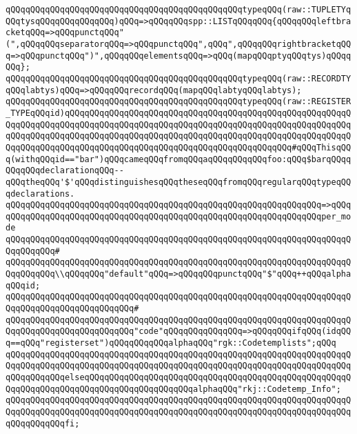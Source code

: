 \verb|qQQqqQQqqQQqqQQqqQQqqQQqqQQqqQQqqQQqqQQqqQQqqQQqtypeqQQq(raw::TUPLETYqQQqtysqQQqqQQqqQQqqQQq)qQQq=>qQQqqQQqspp::LISTqQQqqQQq{qQQqqQQqleftbracketqQQq=>qQQqpunctqQQq"(",qQQqqQQqseparatorqQQq=>qQQqpunctqQQq",qQQq",qQQqqQQqrightbracketqQQq=>qQQqpunctqQQq")",qQQqqQQqelementsqQQq=>qQQq(mapqQQqptyqQQqtys)qQQqqQQq};|\newline
\verb|qQQqqQQqqQQqqQQqqQQqqQQqqQQqqQQqqQQqqQQqqQQqqQQqtypeqQQq(raw::RECORDTYqQQqlabtys)qQQq=>qQQqqQQqrecordqQQq(mapqQQqlabtyqQQqlabtys);|\newline
\newline
\verb|qQQqqQQqqQQqqQQqqQQqqQQqqQQqqQQqqQQqqQQqqQQqqQQqtypeqQQq(raw::REGISTER_TYPEqQQqid)qQQqqQQqqQQqqQQqqQQqqQQqqQQqqQQqqQQqqQQqqQQqqQQqqQQqqQQqqQQqqQQqqQQqqQQqqQQqqQQqqQQqqQQqqQQqqQQqqQQqqQQqqQQqqQQqqQQqqQQqqQQqqQQqqQQqqQQqqQQqqQQqqQQqqQQqqQQqqQQqqQQqqQQqqQQqqQQqqQQqqQQqqQQqqQQqqQQqqQQqqQQqqQQqqQQqqQQqqQQqqQQqqQQqqQQqqQQqqQQqqQQqqQQqqQQqqQQq#qQQqThisqQQq(withqQQqid=="bar")qQQqcameqQQqfromqQQqaqQQqqQQqqQQqfoo:qQQq$barqQQqqQQqqQQqdeclarationqQQq--qQQqtheqQQq'$'qQQqdistinguishesqQQqtheseqQQqfromqQQqregularqQQqtypeqQQqdeclarations.|\newline
\verb|qQQqqQQqqQQqqQQqqQQqqQQqqQQqqQQqqQQqqQQqqQQqqQQqqQQqqQQqqQQqqQQq=>qQQq|\newline
\verb|qQQqqQQqqQQqqQQqqQQqqQQqqQQqqQQqqQQqqQQqqQQqqQQqqQQqqQQqqQQqqQQqper_mode|\newline
\verb|qQQqqQQqqQQqqQQqqQQqqQQqqQQqqQQqqQQqqQQqqQQqqQQqqQQqqQQqqQQqqQQqqQQqqQQqqQQqqQQq#|\newline
\verb|qQQqqQQqqQQqqQQqqQQqqQQqqQQqqQQqqQQqqQQqqQQqqQQqqQQqqQQqqQQqqQQqqQQqqQQqqQQqqQQq\\qQQqqQQq"default"qQQq=>qQQqqQQqpunctqQQq"$"qQQq++qQQqalphaqQQqid;|\newline
\verb|qQQqqQQqqQQqqQQqqQQqqQQqqQQqqQQqqQQqqQQqqQQqqQQqqQQqqQQqqQQqqQQqqQQqqQQqqQQqqQQqqQQqqQQqqQQqqQQq#|\newline
\verb|qQQqqQQqqQQqqQQqqQQqqQQqqQQqqQQqqQQqqQQqqQQqqQQqqQQqqQQqqQQqqQQqqQQqqQQqqQQqqQQqqQQqqQQqqQQqqQQq"code"qQQqqQQqqQQqqQQq=>qQQqqQQqifqQQq(idqQQq==qQQq"registerset")qQQqqQQqqQQqalphaqQQq"rgk::Codetemplists";qQQq|\newline
\verb|qQQqqQQqqQQqqQQqqQQqqQQqqQQqqQQqqQQqqQQqqQQqqQQqqQQqqQQqqQQqqQQqqQQqqQQqqQQqqQQqqQQqqQQqqQQqqQQqqQQqqQQqqQQqqQQqqQQqqQQqqQQqqQQqqQQqqQQqqQQqqQQqqQQqqQQqelseqQQqqQQqqQQqqQQqqQQqqQQqqQQqqQQqqQQqqQQqqQQqqQQqqQQqqQQqqQQqqQQqqQQqqQQqqQQqqQQqqQQqqQQqqQQqalphaqQQq"rkj::Codetemp_Info";|\newline
\verb|qQQqqQQqqQQqqQQqqQQqqQQqqQQqqQQqqQQqqQQqqQQqqQQqqQQqqQQqqQQqqQQqqQQqqQQqqQQqqQQqqQQqqQQqqQQqqQQqqQQqqQQqqQQqqQQqqQQqqQQqqQQqqQQqqQQqqQQqqQQqqQQqqQQqqQQqfi;|\newline
